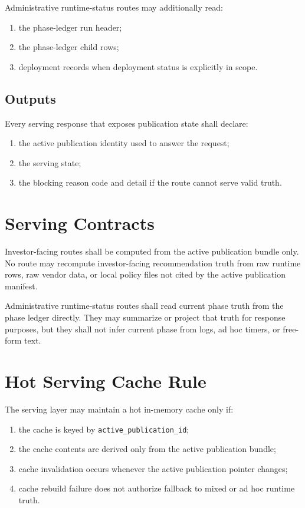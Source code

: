 \documentclass[11pt]{report}
\begin{document}
Administrative runtime-status routes may additionally read:
\begin{enumerate}[leftmargin=1.2cm]
    \item the phase-ledger run header;
    \item the phase-ledger child rows;
    \item deployment records when deployment status is explicitly in scope.
\end{enumerate}

\subsection{Outputs}
Every serving response that exposes publication state shall declare:
\begin{enumerate}[leftmargin=1.2cm]
    \item the active publication identity used to answer the request;
    \item the serving state;
    \item the blocking reason code and detail if the route cannot serve valid truth.
\end{enumerate}

\section{Serving Contracts}
Investor-facing routes shall be computed from the active publication bundle only. No route may recompute investor-facing recommendation truth from raw runtime rows, raw vendor data, or local policy files not cited by the active publication manifest.

Administrative runtime-status routes shall read current phase truth from the phase ledger directly. They may summarize or project that truth for response purposes, but they shall not infer current phase from logs, ad hoc timers, or free-form text.

\section{Hot Serving Cache Rule}
The serving layer may maintain a hot in-memory cache only if:
\begin{enumerate}[leftmargin=1.2cm]
    \item the cache is keyed by \texttt{active\_publication\_id};
    \item the cache contents are derived only from the active publication bundle;
    \item cache invalidation occurs whenever the active publication pointer changes;
    \item cache rebuild failure does not authorize fallback to mixed or ad hoc runtime truth.
\end{enumerate}
\end{document}

